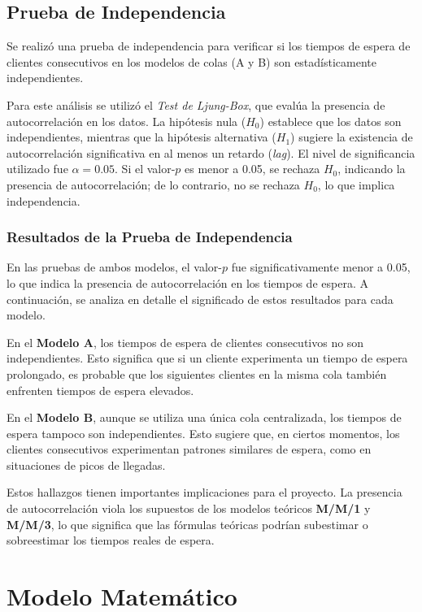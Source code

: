 \documentclass[a4paper,12pt]{article}
\begin{document}
\subsection{Prueba de Independencia}

Se realizó una prueba de independencia para verificar si los tiempos de espera de clientes consecutivos en los modelos de colas (A y B) son estadísticamente independientes.

Para este análisis se utilizó el \textit{Test de Ljung-Box}, que evalúa la presencia de autocorrelación en los datos. La hipótesis nula (\( H_0 \)) establece que los datos son independientes, mientras que la hipótesis alternativa (\( H_1 \)) sugiere la existencia de autocorrelación significativa en al menos un retardo (\textit{lag}). El nivel de significancia utilizado fue \( \alpha = 0.05 \). Si el valor-\( p \) es menor a 0.05, se rechaza \( H_0 \), indicando la presencia de autocorrelación; de lo contrario, no se rechaza \( H_0 \), lo que implica independencia.

\subsubsection{Resultados de la Prueba de Independencia}
En las pruebas de ambos modelos, el valor-\( p \) fue significativamente menor a 0.05, lo que indica la presencia de autocorrelación en los tiempos de espera. A continuación, se analiza en detalle el significado de estos resultados para cada modelo.

En el \textbf{Modelo A}, los tiempos de espera de clientes consecutivos no son independientes. Esto significa que si un cliente experimenta un tiempo de espera prolongado, es probable que los siguientes clientes en la misma cola también enfrenten tiempos de espera elevados.

En el \textbf{Modelo B}, aunque se utiliza una única cola centralizada, los tiempos de espera tampoco son independientes. Esto sugiere que, en ciertos momentos, los clientes consecutivos experimentan patrones similares de espera, como en situaciones de picos de llegadas.

Estos hallazgos tienen importantes implicaciones para el proyecto. La presencia de autocorrelación viola los supuestos de los modelos teóricos \textbf{M/M/1} y \textbf{M/M/3}, lo que significa que las fórmulas teóricas podrían subestimar o sobreestimar los tiempos reales de espera. 

\section{Modelo Matemático}
\end{document}
